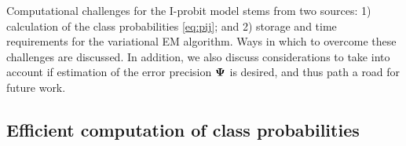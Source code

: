 Computational challenges for the I-probit model stems from two sources: 1) calculation of the class probabilities \cref{eq:pij}; and 2) storage and time requirements for the variational EM algorithm.
Ways in which to overcome these challenges are discussed.
In addition, we also discuss considerations to take into account if estimation of the error precision ${\bm\Psi}$ is desired, and thus path a road for future work.

\subsection{Efficient computation of class probabilities}
\label{sec:mnint}


%

